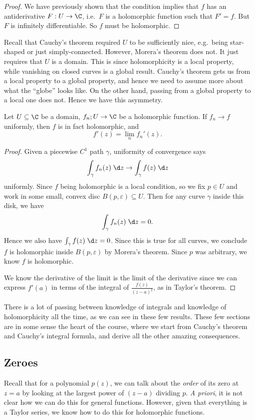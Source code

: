 \documentclass[a4paper]{article}
\begin{document}
\begin{proof}
  We have previously shown that the condition implies that $f$ has an antiderivative $F: U \to \C$, i.e.\ $F$ is a holomorphic function such that $F' = f$. But $F$ is infinitely differentiable. So $f$ must be holomorphic.
\end{proof}

Recall that Cauchy's theorem required $U$ to be sufficiently nice, e.g.\ being star-shaped or just simply-connected. However, Morera's theorem does not. It just requires that $U$ is a domain. This is since holomorphicity is a local property, while vanishing on closed curves is a global result. Cauchy's theorem gets us from a local property to a global property, and hence we need to assume more about what the ``globe'' looks like. On the other hand, passing from a global property to a local one does not. Hence we have this asymmetry.

\begin{cor}
  Let $U \subseteq \C$ be a domain, $f_n; U \to \C$ be a holomorphic function. If $f_n \to f$ uniformly, then $f$ is in fact holomorphic, and
  \[
    f'(z) = \lim_n f_n'(z).
  \]
\end{cor}
\begin{proof}
  Given a piecewise $C^1$ path $\gamma$, uniformity of convergence says
  \[
    \int_\gamma f_n(z)\;\d z \to \int_\gamma f(z)\;\d z
  \]
  uniformly. Since $f$ being holomorphic is a local condition, so we fix $p \in U$ and work in some small, convex disc $B(p, \varepsilon) \subseteq U$. Then for any curve $\gamma$ inside this disk, we have
  \[
    \int_\gamma f_n(z) \;\d z = 0.
  \]
  Hence we also have $\int_\gamma f(z)\;\d z = 0$. Since this is true for all curves, we conclude $f$ is holomorphic inside $B(p, \varepsilon)$ by Morera's theorem. Since $p$ was arbitrary, we know $f$ is holomorphic.

  We know the derivative of the limit is the limit of the derivative since we can express $f'(a)$ in terms of the integral of $\frac{f(z)}{(z - a)^2}$, as in Taylor's theorem.
\end{proof}
There is a lot of passing between knowledge of integrals and knowledge of holomorphicity all the time, as we can see in these few results. These few sections are in some sense the heart of the course, where we start from Cauchy's theorem and Cauchy's integral formula, and derive all the other amazing consequences.

\subsection{Zeroes}
Recall that for a polynomial $p(z)$, we can talk about the \emph{order} of its zero at $z = a$ by looking at the largest power of $(z - a)$ dividing $p$. \emph{A priori}, it is not clear how we can do this for general functions. However, given that everything is a Taylor series, we know how to do this for holomorphic functions.
\end{document}
